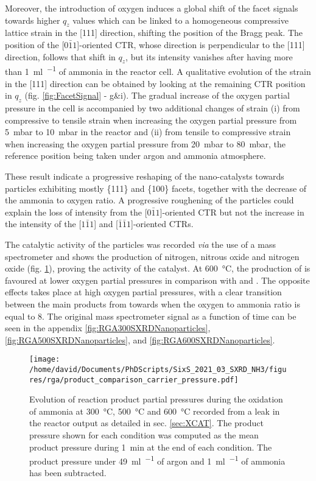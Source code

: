 Moreover, the introduction of oxygen induces a global shift of the facet signals towards higher $q_z$ values which can be linked to a homogeneous compressive lattice strain in the [111] direction, shifting the position of the Bragg peak.
The position of the [$0\bar{1}1$]-oriented CTR, whose direction is perpendicular to the [111] direction, follows that shift in $q_z$, but its intensity vanishes after having more than \qty{1}{\ml\per\min} of ammonia in the reactor cell.
A qualitative evolution of the strain in the [111] direction can be obtained by looking at the remaining CTR position in $q_z$ (fig. \ref{fig:FacetSignal} - g\&i).
The gradual increase of the oxygen partial pressure in the cell is accompanied by two additional changes of strain (i) from compressive to tensile strain when increasing the oxygen partial pressure from \qty{5}{\milli\bar} to \qty{10}{\milli\bar} in the reactor and (ii) from tensile to compressive strain when increasing the oxygen partial pressure from \qty{20}{\milli\bar} to \qty{80}{\milli\bar}, the reference position being taken under argon and ammonia atmosphere.

These result indicate a progressive reshaping of the nano-catalysts towards particles exhibiting mostly \{111\} and \{100\} facets, together with the decrease of the ammonia to oxygen ratio.
A progressive roughening of the particles could explain the loss of intensity from the [$0\bar{1}1$]-oriented CTR but not the increase in the intensity of the [$1\bar{1}1$] and [$\bar{1}\bar{1}1$]-oriented CTRs.

The catalytic activity of the particles was recorded \textit{via} the use of a mass spectrometer and shows the production of nitrogen, nitrous oxide and nitrogen oxide (fig. \ref{fig:RGASXRDNanoparticlesComparison}), proving the activity of the catalyst.
At \qty{600}{\degreeCelsius}, the production of  is favoured at lower oxygen partial pressures in comparison with  and .
The opposite effects takes place at high oxygen partial pressures, with a clear transition between the main products from  towards  when the oxygen to ammonia ratio is equal to 8.
The original mass spectrometer signal as a function of time can be seen in the appendix \ref{fig:RGA300SXRDNanoparticles}, \ref{fig:RGA500SXRDNanoparticles}, and \ref{fig:RGA600SXRDNanoparticles}.

\begin{figure}[!htb]
    \centering
    \texttt{[image: /home/david/Documents/PhDScripts/SixS\_2021\_03\_SXRD\_NH3/figures/rga/product\_comparison\_carrier\_pressure.pdf]}
    \caption{
        Evolution of reaction product partial pressures during the oxidation of ammonia at \qty{300}{\degreeCelsius}, \qty{500}{\degreeCelsius} and \qty{600}{\degreeCelsius} recorded from a leak in the reactor output as detailed in sec. \ref{sec:XCAT}.
        The product pressure shown for each condition was computed as the mean product pressure during \qty{1}{\minute} at the end of each condition.
        The product pressure under \qty{49}{\ml\per\min} of argon and \qty{1}{\ml\per\min} of ammonia has been subtracted.
    }
    \label{fig:RGASXRDNanoparticlesComparison}
\end{figure}

